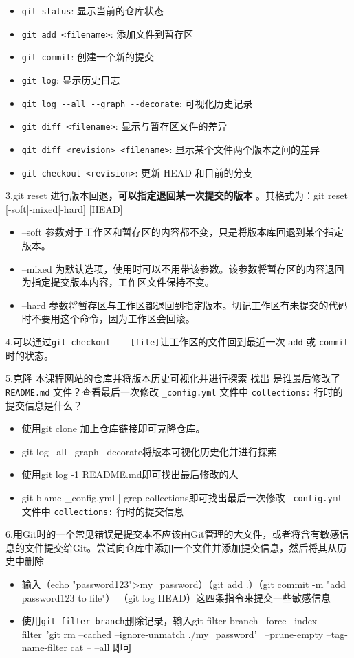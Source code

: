 \documentclass{article}
\begin{document}
\begin{itemize}
    \item \verb|git status|: 显示当前的仓库状态
    \item \verb|git add <filename>|: 添加文件到暂存区
    \item \verb|git commit|: 创建一个新的提交
    \item \verb|git log|: 显示历史日志
    \item \verb|git log --all --graph --decorate|: 可视化历史记录
    \item \verb|git diff <filename>|: 显示与暂存区文件的差异
    \item \verb|git diff <revision> <filename>|: 显示某个文件两个版本之间的差异
    \item \verb|git checkout <revision>|: 更新 HEAD 和目前的分支

\end{itemize}
3.git reset 进行版本回退\textbf{，可以指定退回某⼀次提交的版本} 
。其格式为：git reset [-soft|-mixed|-hard] [HEAD] \newline
\begin{itemize}
    \item --soft 参数对于⼯作区和暂存区的内容都不变，只是将版本库回退到某个指定版本。
    \item  --mixed 为默认选项，使⽤时可以不⽤带该参数。该参数将暂存区的内容退回为指定提交版本内容，⼯作区⽂件保持不变。 
    \item --hard 参数将暂存区与⼯作区都退回到指定版本。切记⼯作区有未提交的代码时不要⽤这个命令，因为⼯作区会回滚。 
\end{itemize}
4.可以通过\verb|git checkout -- [file]|让工作区的文件回到最近一次 \verb|add| 或 \verb|commit|时的状态。 

5.克隆 \href{https://github.com/missing-semester-cn/missing-semester-cn.github.io.git}{本课程网站的仓库}并将版本历史可视化并进行探索
找出 是谁最后修改了 \verb|README.md| 文件？查看最后一次修改 \verb|_config.yml| 文件中 \verb|collections:| 行时的提交信息是什么？
\begin{itemize}
    \item 使用git clone 加上仓库链接即可克隆仓库。
    \item git log --all --graph --decorate将版本可视化历史化并进行探索 
    \item 使用git log -1 README.md即可找出最后修改的人
    \item git blame \_config.yml | grep collections即可找出最后一次修改 \verb|_config.yml| 文件中 \verb|collections:| 行时的提交信息
\end{itemize}
6.用Git时的一个常见错误是提交本不应该由Git管理的大文件，或者将含有敏感信息的文件提交给Git。尝试向仓库中添加一个文件并添加提交信息，然后将其从历史中删除
\begin{itemize}
    \item 输入（echo "password123">my\_password）（git add .）（git commit -m "add password123 to file"）
 （git log HEAD）这四条指令来提交一些敏感信息
 \item 使用\verb|git filter-branch|删除记录，输入git filter-branch --force --index-filter\
 'git rm --cached --ignore-unmatch ./my\_password' \
 --prune-empty --tag-name-filter cat -- --all 即可
\end{itemize}
\end{document}

